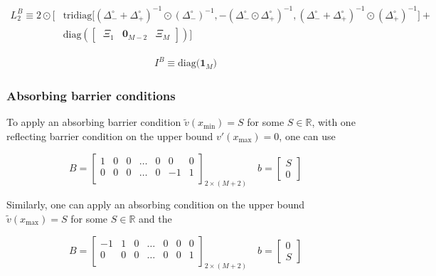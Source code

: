 \documentclass[11pt]{article}
\newcommand{\diag}{\ensuremath{\mathrm{diag}}}
\theoremstyle{definition}
\begin{document}
\begin{align}
{L}_{2}^B \equiv
2 \odot \Big[ & \text{tridiag} \Big[(\Delta_-^\circ + \Delta_+^\circ)^{-1} \odot (\Delta_{-}^\circ)^{-1}, 
-(\Delta_-^\circ \odot \Delta_+^\circ)^{-1},
(\Delta_-^\circ + \Delta_+^\circ)^{-1} \odot (\Delta_{+}^\circ)^{-1} \Big] + \\ & \diag\left(  
\begin{bmatrix} \
\Xi_1 & \mathbf{0}_{M-2} & \Xi_M
\end{bmatrix}
  \right) \Big]
\end{align}

\begin{align}
I^B \equiv  \text{diag($\mathbf{1}_M$)}
\end{align}


\subsubsection{Absorbing barrier conditions}

To apply an absorbing barrier condition $\tilde{v}(x_{\min}) =S$ for some $S \in \mathbb{R}$, with one reflecting barrier condition on the upper bound $v'(x_{\max}) = 0$, one can use

\begin{equation}\label{eq:absorbing-barrier-matrix}
B = \begin{bmatrix}
1 & 0 & 0 & \dots & 0 & 0 & 0 \\
0 & 0 & 0 & \dots & 0 & -1 & 1\\
\end{bmatrix}_{2 \times (M+2)} \quad
b = \begin{bmatrix}
S \\
0
\end{bmatrix}
\end{equation}

Similarly, one can apply an absorbing condition on the upper bound  $\tilde{v}(x_{\max}) =S$ for some $S \in \mathbb{R}$ and the


\begin{equation}\label{eq:absorbing-barrier-matrix-ub}
B = \begin{bmatrix}
-1 & 1 & 0 & \dots & 0 & 0 & 0 \\
0 & 0 & 0 & \dots & 0 & 0 & 1\\
\end{bmatrix}_{2 \times (M+2)} \quad
b = \begin{bmatrix}
0 \\
S
\end{bmatrix}
\end{equation}
\end{document}
